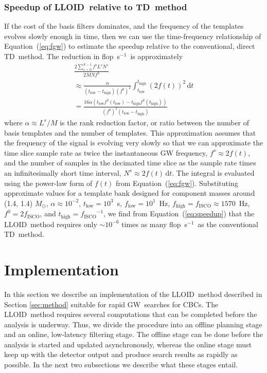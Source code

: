 \documentclass[preprint2]{aastex}
\newcommand{\GW}{GW}%
\newcommand{\CBC}{CBC}%
\newcommand{\tmpsamps}{\ensuremath{N}}
\newcommand{\numtmps}{\ensuremath{M}}
\newcommand{\svdtmps}[1]{\ensuremath{L^#1}}
\newcommand{\numsvdtmps}{\svdtmps{s}}
\newcommand{\slicesamps}[1]{\ensuremath{N^#1}}
\newcommand{\slicessamps}{\slicesamps{s}}
\newcommand{\flops}{flop~s$^{-1}$}
\newcommand{\lloid}{LLOID}%
\newcommand{\TD}{TD}%
\begin{document}
\subsubsection{Speedup of \lloid\ relative to \TD\ method}

If the cost of the basis filters dominates, and the frequency of the templates
evolves slowly enough in time, then we can use the time-frequency relationship
of Equation~(\ref{eq:fgw}) to estimate the speedup relative to the conventional, direct
\TD\ method.  The reduction in \flops\ is approximately
%
\begin{multline}
\label{eq:speedup}
\frac{2 \sum_{s=0}^{S-1} f^s \numsvdtmps \slicessamps}{2 \numtmps \tmpsamps f^0} \\
\approx \frac{\alpha}{\left(t_\mathrm{low} - t_\mathrm{high}\right) \left(f^0\right)^2} \int_{t_\mathrm{low}}^{t_\mathrm{high}} \left(2 f(t) \right)^2 \, \mathrm{d} t \\
= \frac{16 \alpha \left(t_\mathrm{low} f^2 (t_\mathrm{low}) - t_\mathrm{high} f^2 (t_\mathrm{high}) \right)}{\left(f^0\right)^2 \left(t_\mathrm{low} - t_\mathrm{high}\right)}
\end{multline}
%
where $\alpha \approx \numsvdtmps / \numtmps$ is the rank reduction factor, or
ratio between the number of basis templates and the number of templates.  This
approximation assumes that the frequency of the signal is evolving very slowly
so that we can approximate the time slice sample rate as twice the instantaneous
GW frequency, $f^s \approx 2 f(t)$, and the number of samples in
the decimated time slice as the sample rate times an infinitesimally short time
interval, $\slicessamps \approx 2 f(t) \, \mathrm{d}t$. The integral is
evaluated using the power-law form of $f(t)$ from Equation~(\ref{eq:fgw}).
Substituting approximate values for a template bank designed for component
masses around (1.4, 1.4) $M_\odot$, $\alpha \approx 10^{-2}$, $t_\mathrm{low} = 10^3$~s, $f_\mathrm{low} = 10^1$~Hz, $f_\mathrm{high} = f_\mathrm{ISCO} \approx 1570$~Hz, $f^0 = 2 f_\mathrm{ISCO}$, and $t_\mathrm{high} = {f_\mathrm{ISCO}}^{-1}$, we find from Equation~(\ref{eq:speedup}) that the
\lloid\ method requires only $\sim 10^{-6}$ times as many \flops\ as the
conventional \TD\ method.

\section{Implementation}

In this section we describe an implementation of the \lloid\ method described
in Section \ref{sec:method} suitable for rapid \GW\
searches for \CBC{}s.  The \lloid\ method requires several
computations that can be completed before the analysis is underway.  Thus, 
we divide the procedure into an offline planning stage and an
online, low-latency filtering stage.  The offline stage can be done before the
analysis is started and updated asynchronously, whereas the online stage must
keep up with the detector output and produce search results as rapidly as
possible.  In the next two subsections we describe what these stages entail.
\end{document}
